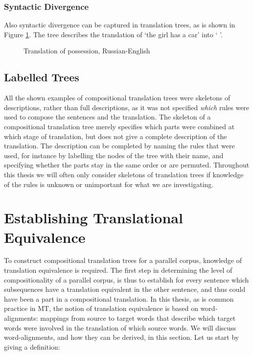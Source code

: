 \subsubsection{Syntactic Divergence}

Also syntactic divergence can be captured in translation trees, as is shown in Figure \ref{fig:russian}. The tree describes the translation of `the girl has a car' into `    '.

\begin{figure}[!ht]
\centering

\caption{Translation of possession, Russian-English}\label{fig:russian}
\end{figure}

\subsection{Labelled Trees}

All the shown examples of compositional translation trees were skeletons of descriptions, rather than full descriptions, as it was not specified \textit{which} rules were used to compose the sentences and the translation. The skeleton of a compositional translation tree merely specifies which parts were combined at which stage of translation, but does not give a complete description of the translation. The description can be completed by naming the rules that were used, for instance by labelling the nodes of the tree with their name, and specifying whether the parts stay in the same order or are permuted. Throughout this thesis we will often only consider skeletons of translation trees if knowledge of the rules is unknown or unimportant for what we are investigating.


\section{Establishing Translational Equivalence}
\label{sec:trans_eq}

To construct compositional translation trees for a parallel corpus, knowledge of translation equivalence is required. The first step in determining the level of compositionality of a parallel corpus, is thus to establish for every sentence which subsequences have a translation equivalent in the other sentence, and thus could have been a part in a compositional translation. In this thesis, as is common practice in MT, the notion of translation equivalence is based on word-alignments: mappings from source to target words that describe which target words were involved in the translation of which source words. We will discuss word-alignments, and how they can be derived, in this section. Let us start by giving a definition:


